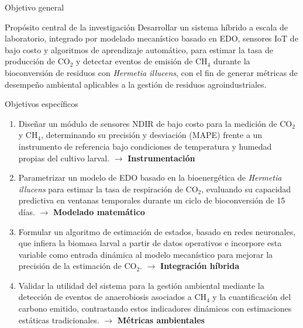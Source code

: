 \documentclass[aspectratio=169, 11pt]{beamer}
\begin{document}
\begin{frame}{Objetivo general}
\begin{block}{Propósito central de la investigación}
\small
Desarrollar un sistema híbrido a escala de laboratorio, integrado por modelado mecanístico basado en EDO, sensores IoT de bajo costo y algoritmos de aprendizaje automático, para estimar la tasa de producción de CO$_2$ y detectar eventos de emisión de CH$_4$ durante la bioconversión de residuos con \textit{Hermetia illucens}, con el fin de generar métricas de desempeño ambiental aplicables a la gestión de residuos agroindustriales.
\end{block}

\end{frame}
\begin{frame}{Objetivos espec\'ificos}

\begin{block}{}
\footnotesize
\begin{enumerate}
    \item Diseñar un m\'odulo de sensores NDIR de bajo costo para la medici\'on de CO$_2$ y CH$_4$, determinando su precisi\'on y desviaci\'on (MAPE) frente a un instrumento de referencia bajo condiciones de temperatura y humedad propias del cultivo larval. $\rightarrow$ \textbf{Instrumentaci\'on}

    \item Parametrizar un modelo de EDO basado en la bioenerg\'etica de \textit{Hermetia illucens} para estimar la tasa de respiraci\'on de CO$_2$, evaluando su capacidad predictiva en ventanas temporales durante un ciclo de bioconversi\'on de 15 d\'ias. $\rightarrow$ \textbf{Modelado matem\'atico}

    \item Formular un algoritmo de estimaci\'on de estados, basado en redes neuronales, que infiera la biomasa larval a partir de datos operativos e incorpore esta variable como entrada din\'amica al modelo mecan\'istico para mejorar la precisi\'on de la estimaci\'on de CO$_2$. $\rightarrow$ \textbf{Integraci\'on h\'ibrida}

    \item Validar la utilidad del sistema para la gesti\'on ambiental mediante la detecci\'on de eventos de anaerobiosis asociados a CH$_4$ y la cuantificaci\'on del carbono emitido, contrastando estos indicadores din\'amicos con estimaciones est\'aticas tradicionales. $\rightarrow$ \textbf{M\'etricas ambientales}
\end{enumerate}
\end{block}

\end{frame}%
\end{document}
